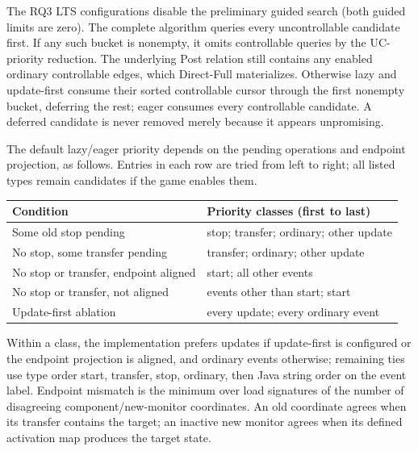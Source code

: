 The RQ3 LTS configurations disable the preliminary guided search (both guided limits are zero). The complete algorithm queries every uncontrollable candidate first. If any such bucket is nonempty, it omits controllable queries by the UC-priority reduction. The underlying Post relation still contains any enabled ordinary controllable edges, which Direct-Full materializes. Otherwise lazy and update-first consume their sorted controllable cursor through the first nonempty bucket, deferring the rest; eager consumes every controllable candidate. A deferred candidate is never removed merely because it appears unpromising.

The default lazy/eager priority depends on the pending operations and endpoint projection, as follows. Entries in each row are tried from left to right; all listed types remain candidates if the game enables them.
\begin{center}\small
\begin{tabular}{@{}p{.40\linewidth}p{.56\linewidth}@{}}\toprule
Condition & Priority classes (first to last)\\\midrule
Some old stop pending & stop; transfer; ordinary; other update\\
No stop, some transfer pending & transfer; ordinary; other update\\
No stop or transfer, endpoint aligned & start; all other events\\
No stop or transfer, not aligned & events other than start; start\\
Update-first ablation & every update; every ordinary event\\\bottomrule
\end{tabular}
\end{center}
Within a class, the implementation prefers updates if update-first is configured or the endpoint projection is aligned, and ordinary events otherwise; remaining ties use type order start, transfer, stop, ordinary, then Java string order on the event label. Endpoint mismatch is the minimum over load signatures of the number of disagreeing component/new-monitor coordinates. An old coordinate agrees when its transfer contains the target; an inactive new monitor agrees when its defined activation map produces the target state.


